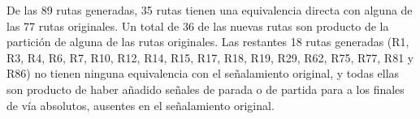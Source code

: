     De las 89 rutas generadas, 35 rutas tienen una equivalencia directa con alguna de las 77 rutas originales. Un total de 36 de las nuevas rutas son producto de la partición de alguna de las rutas originales. Las restantes 18 rutas generadas (R1, R3, R4, R6, R7, R10, R12, R14, R15, R17, R18, R19, R29, R62, R75, R77, R81 y R86) no tienen ninguna equivalencia con el señalamiento original, y todas ellas son producto de haber añadido señales de parada o de partida para a los finales de vía absolutos, ausentes en el señalamiento original.
    